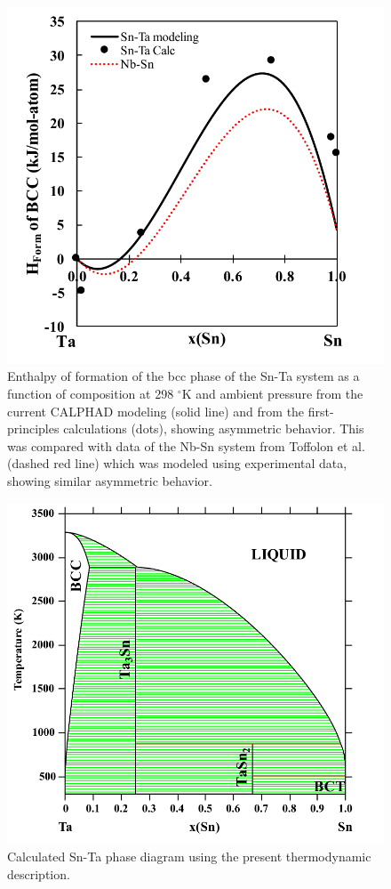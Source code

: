 \pagebreak
\begin{figure}[H]
	\centering
	\includegraphics[width=\textwidth]{Chapter-4/Figures/HofForm.pdf}
	\caption{Enthalpy of formation of the bcc phase of the Sn-Ta system as a function of composition at 298 $^{\circ}$K and ambient pressure from the current CALPHAD modeling (solid line) and from the first-principles calculations (dots), showing asymmetric behavior. This was compared with data of the Nb-Sn system from Toffolon et al. \cite{Toffolon1998} (dashed red line) which was modeled using experimental data, showing similar asymmetric behavior.}
	\label{Ch4-figure:HofForm}
\end{figure}

\pagebreak
\begin{figure}[H]
	\centering
	\includegraphics[width=\textwidth]{Chapter-4/Figures/SnTaPD.pdf}
	\caption{Calculated Sn-Ta phase diagram using the present thermodynamic description.}
	\label{Ch4-figure:SnTaPD}
\end{figure}

